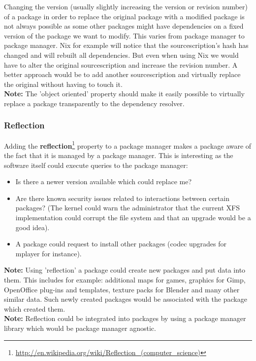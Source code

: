 \documentclass[a4paper,10pt]{article}
\begin{document}
Changing the version (usually slightly increasing the version or revision number) of a package in order to replace the original package with a modified package is not always possible as some other packages might have dependencies on a fixed version of the package we want to modify. This varies from package manager to package manager. Nix for example will notice that the sourcescription's hash has changed and will rebuilt all dependencies. But even when using Nix we would have to alter the original sourcescription and increase the revision number. A better approach would be to add another sourcescription and virtually replace the original without having to touch it. \\

\textbf{Note:} The 'object oriented' property should make it easily possible to virtually replace a package transparently to the dependency resolver.

\subsubsection{Reflection}
Adding the \textbf{reflection}\footnote{\url{http://en.wikipedia.org/wiki/Reflection_(computer_science)}} property to a package manager makes a package aware of the fact that it is managed by a package manager. This is interesting as the software itself could execute queries to the package manager:
\begin{itemize}
\item Is there a newer version available which could replace me?
\item Are there known security issues related to interactions between certain packages? (The kernel could warn the administrator that the current XFS implementation could corrupt the file system and that an upgrade would be a good idea).
\item A package could request to install other packages (codec upgrades for mplayer for instance).
\end{itemize}

\textbf{Note:} Using 'reflection' a package could create new packages and put data into them. This includes for example: additional maps for games, graphics for Gimp, OpenOffice plug-ins and templates, texture packs for Blender and many other similar data. Such newly created packages would be associated with the package which created them.\\

\textbf{Note:} Reflection could be integrated into packages by using a package manager library which would be package manager agnostic.
\end{document}
